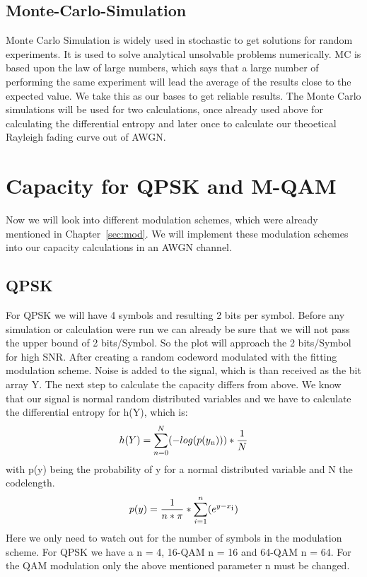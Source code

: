 \documentclass[12pt,oneside, reqno]{report}
\begin{document}
\subsection{Monte-Carlo-Simulation}
Monte Carlo Simulation is widely used in stochastic to get solutions for random experiments. It is used to solve analytical unsolvable problems numerically. MC is based upon the law of large numbers, which says that a large number of performing the same experiment will lead the average of the results close to the expected value. We take this as our bases to get reliable results. The Monte Carlo simulations will be used for two calculations, once already used above for calculating the differential entropy and later once to calculate our theoetical Rayleigh fading curve out of AWGN. 

\section{Capacity for QPSK and M-QAM}
Now we will look into different modulation schemes, which were already mentioned in Chapter~\autoref{sec:mod}. We will implement these modulation schemes into our capacity calculations in an AWGN channel.
\subsection{QPSK}
For QPSK we will have 4 symbols and resulting 2 bits per symbol. Before any simulation or calculation were run we can already be sure that we will not pass the upper bound of 2 bits/Symbol. So the plot will approach the 2 bits/Symbol for high SNR.
After creating a random codeword modulated with the fitting modulation scheme. Noise is added to the signal, which is than received as the bit array Y. The next step to calculate the capacity differs from above. 
\newline
We know that our signal is normal random distributed variables and we have to calculate the differential entropy for h(Y), which is: 
\begin{equation}
\label{eq:entropy}
h(Y) =  \sum_{n=0}^N(-log(p(y\textsubscript{n}))) * \frac{1}{N}
\end{equation} 
with p(y) being the probability of y for a normal distributed variable and N the codelength.
\begin{equation}
p(y) = \frac{1}{n*\pi}*\sum_{i=1}^n(e^{y-x\textsubscript{i}})
\end{equation} 
Here we only need to watch out for the number of symbols in the modulation scheme. For QPSK we have a n = 4, 16-QAM n = 16 and 64-QAM n = 64.
\newline
For the QAM modulation only the above mentioned parameter n must be changed.
 
\end{document}
